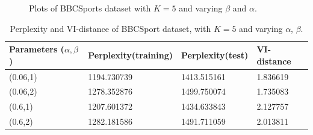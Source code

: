 \documentclass{article} %
\begin{document}
\begin{figure}
\centering 
{} 
\caption{ Plots of BBCSports dataset with $K= 5$ and varying $\beta$ and $\alpha$.} 
\label{4} 
\end{figure}
\begin{table}
\centering 
    \begin{tabular}{|l|l|l|l|}
    \hline
    Parameters ($\alpha, \beta$) & Perplexity(training) & Perplexity(test) & VI-distance \\ \hline
    (0.06,1)      & 1194.730739          & 1413.515161      & 1.836619    \\ \hline
    (0.06,2)      & 1278.352876          & 1499.750074      & 1.735083    \\ \hline
    (0.6,1)       & 1207.601372          & 1434.633843      & 2.127757    \\ \hline
    (0.6,2)       & 1282.181586          & 1491.711059      & 2.013811    \\ \hline
    \end{tabular}  
    \caption{Perplexity and VI-distance of BBCSport dataset, with $K= 5$ and varying $\alpha$, $\beta$.}   
     \label{table4}
\end{table}
\end{document}
